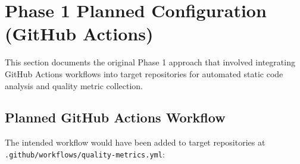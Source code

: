 
\appendix

\section{Phase 1 Planned Configuration (GitHub Actions)}

This section documents the original Phase 1 approach that involved integrating GitHub Actions workflows into target repositories for automated static code analysis and quality metric collection.

\subsection{Planned GitHub Actions Workflow}

The intended workflow would have been added to target repositories at \texttt{.github/workflows/quality-metrics.yml}:

